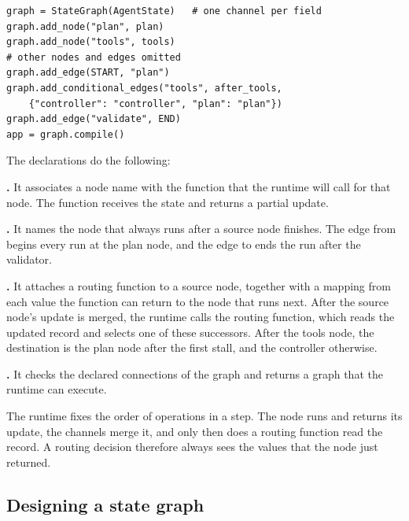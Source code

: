 \noindent\begin{minipage}{\linewidth}
\begin{lstlisting}[basicstyle=\ttfamily\footnotesize, caption={Illustrative code that builds and
compiles the planning agent's graph, with most declarations omitted.}, label=lst:records-compile]
graph = StateGraph(AgentState)   # one channel per field
graph.add_node("plan", plan)
graph.add_node("tools", tools)
# other nodes and edges omitted
graph.add_edge(START, "plan")
graph.add_conditional_edges("tools", after_tools,
    {"controller": "controller", "plan": "plan"})
graph.add_edge("validate", END)
app = graph.compile()
\end{lstlisting}
\end{minipage}

The declarations do the following:
\bi
\item \textbf{.} It associates a node name with the function that the runtime
will call for that node. The function receives the state and returns a partial update.
\item \textbf{.} It names the node that always runs after a source node
finishes. The edge from  begins every run at the plan node, and the edge to
 ends the run after the validator.
\item \textbf{.} It attaches a routing function to a source node,
together with a mapping from each value the function can return to the node that runs next. After
the source node's update is merged, the runtime calls the routing function, which reads the updated
record and selects one of these successors. After the tools node, the destination is the plan node
after the first stall, and the controller otherwise.
\item \textbf{.} It checks the declared connections of the graph and returns a
graph that the runtime can execute.
\ei

The runtime fixes the order of operations in a step. The node runs and returns its update, the
channels merge it, and only then does a routing function read the record. A routing decision
therefore always sees the values that the node just returned.

\subsection{Designing a state graph}
\label{sec:records-design}

